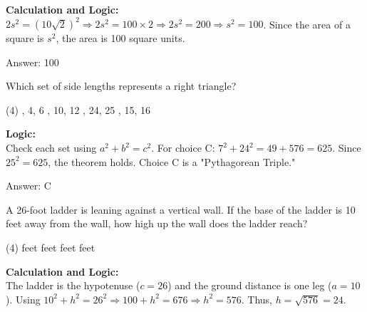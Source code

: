 \documentclass[11pt,paper=a4,answers]{exam}
\begin{document}
\begin{questions}
\begin{solution}
\vspace{30pt}

\textbf{Calculation and Logic:} \\
$2s^2 = (10\sqrt{2})^2 \Rightarrow 2s^2 = 100 \times 2 \Rightarrow 2s^2 = 200 \Rightarrow s^2 = 100$. Since the area of a square is $s^2$, the area is 100 square units.

\vspace{30pt}

Answer: \colorbox{yellow!100}{100}
\end{solution}

\vspace{60pt}

\question
Which set of side lengths represents a right triangle?
\begin{tasks}(4)
    , 4, 6
    , 10, 12
    , 24, 25
    , 15, 16
\end{tasks}

\begin{solution}
\textbf{Logic:} \\
Check each set using $a^2 + b^2 = c^2$. For choice C: $7^2 + 24^2 = 49 + 576 = 625$. Since $25^2 = 625$, the theorem holds. Choice C is a "Pythagorean Triple."

\vspace{30pt}

Answer: \colorbox{yellow!100}{C}
\end{solution}

\vspace{60pt}

\question
A 26-foot ladder is leaning against a vertical wall. If the base of the ladder is 10 feet away from the wall, how high up the wall does the ladder reach?
\begin{tasks}(4)
     feet
     feet
     feet
     feet
\end{tasks}

\begin{solution}
\textbf{Calculation and Logic:} \\
The ladder is the hypotenuse ($c=26$) and the ground distance is one leg ($a=10$). Using $10^2 + h^2 = 26^2 \Rightarrow 100 + h^2 = 676 \Rightarrow h^2 = 576$. Thus, $h = \sqrt{576} = 24$.

\vspace{30pt}


\end{solution}
\end{questions}
\end{document}
